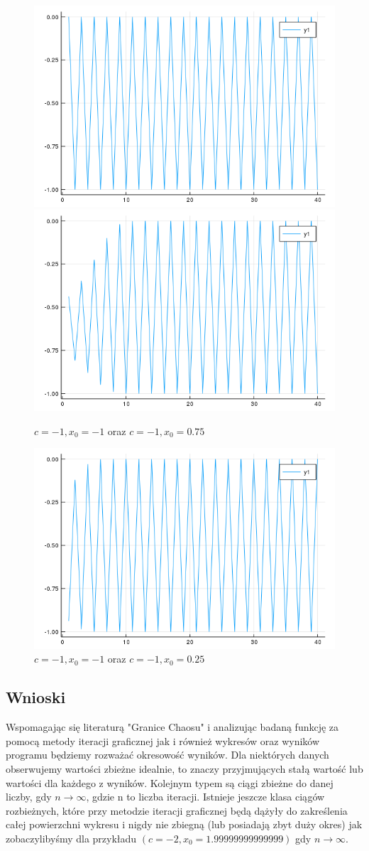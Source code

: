 \documentclass{article}
\begin{document}
            \begin{figure}
                \centering                 \includegraphics[width=0.49\linewidth]{plot_5.png}                \includegraphics[width=0.49\linewidth]{plot_6.png}
                \caption{$c = -1, x_0 = -1$ oraz $c = -1, x_0 = 0.75$}
                \label{fig:zad6:fig3}
            \end{figure}
            \begin{figure}
                \centering                 \includegraphics[width=\linewidth]{plot_7.png}
                \caption{$c = -1, x_0 = -1$ oraz $c = -1, x_0 = 0.25$}
                \label{fig:zad6:fig4}
            \end{figure}
        \subsection{Wnioski}
            Wspomagając się literaturą "Granice Chaosu" i analizując badaną funkcję za pomocą metody iteracji graficznej jak i również wykresów oraz wyników programu będziemy rozważać okresowość wyników. Dla niektórych danych obserwujemy wartości zbieżne idealnie, to znaczy przyjmujących stałą wartość lub wartości dla każdego z wyników. Kolejnym typem są ciągi zbieżne do danej liczby, gdy ${n\rightarrow \infty}$, gdzie n to liczba iteracji. Istnieje jeszcze klasa ciągów rozbieżnych, które przy metodzie iteracji graficznej będą dążyły do zakreślenia całej powierzchni wykresu i nigdy nie zbiegną (lub posiadają zbyt duży okres) jak zobaczylibyśmy dla przykładu $(c = -2, x_0 = 1.99999999999999)$ gdy $n\rightarrow \infty$.
\end{document}
